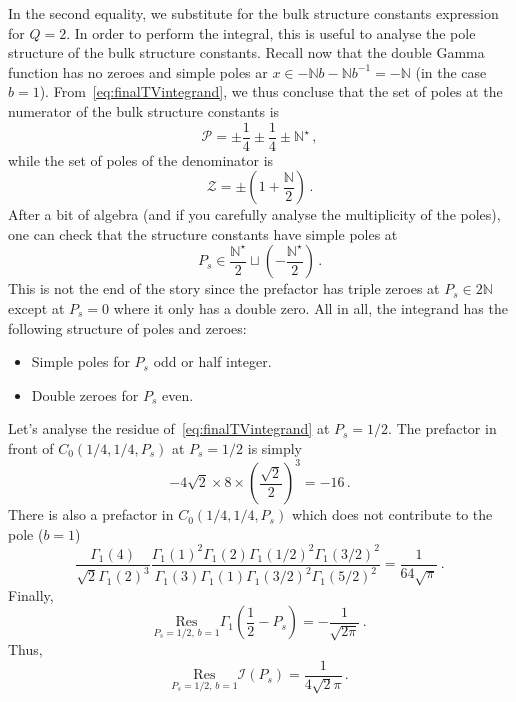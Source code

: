 \documentclass[11pt]{article}
\begin{document}
In the second equality, we substitute for the bulk structure constants expression for $Q=2$. In order to perform the integral, this is useful to analyse the pole structure of the bulk structure constants. Recall now that the double Gamma function has no zeroes and simple poles ar $x\in -\mathbb{N}b-\mathbb{N}b^{-1}=-\mathbb{N}$ (in the case $b=1$). From~\eqref{eq:finalTVintegrand}, we thus concluse that the set of poles at the numerator of the bulk structure constants is
\begin{equation}
    \mathcal{P} = \pm\frac{1}{4}\pm\frac{1}{4}\pm\mathbb{N}^{\star}\,,
\end{equation}
while the set of poles of the denominator is 
\begin{equation}
    \mathcal{Z} = \pm\left(1+\frac{\mathbb{N}}{2}\right)\,.
\end{equation}
After a bit of algebra (and if you carefully analyse the multiplicity of the poles), one can check that the structure constants have simple poles at
\begin{equation}
    P_s \in \frac{\mathbb{N}^\star}{2} \sqcup \left(-\frac{\mathbb{N}^\star}{2}\right)\,.
\end{equation}
This is not the end of the story since the prefactor has triple zeroes at $P_s \in 2\mathbb{N}$ except at $P_s=0$ where it only has a double zero. All in all, the integrand has the following structure of poles and zeroes:
\begin{itemize}
    \item Simple poles for $P_s$ odd or half integer.
    \item Double zeroes for $P_s$ even.
\end{itemize}
Let's analyse the residue of~\eqref{eq:finalTVintegrand} at $P_s=1/2$. The prefactor in front of $C_0(1/4,1/4,P_s)$ at $P_s=1/2$ is simply 
\[
-4\sqrt{2}\times 8 \times \left(\frac{\sqrt{2}}{2}\right)^3 = -16\,.
\]
There is also a prefactor in $C_0(1/4,1/4,P_s)$ which does not contribute to the pole ($b=1$)
\begin{equation}
        \frac{\Gamma_1(4)}{\sqrt{2}\Gamma_1(2)^3}\frac{\Gamma_1(1)^2 \Gamma_1(2)\Gamma_1(1/2)^2 \Gamma_1(3/2)^2}{\Gamma_1(3)\Gamma_1(1)\Gamma_1(3/2)^2 \Gamma_1(5/2)^2}=\frac{1}{64\sqrt{\pi}}\,.
\end{equation}
Finally,
\begin{equation}
    \underset{P_s=1/2,\,b=1}{\mathrm{Res}}\Gamma_1\left(\frac{1}{2}-P_s\right)=-\frac{1}{\sqrt{2\pi}}\,.
\end{equation}
Thus,
\begin{equation}
    \underset{P_s=1/2,\,b=1}{\mathrm{Res}}\mathcal{I}(P_s) = \frac{1}{4\sqrt{2}\pi}\,.
\end{equation}
\end{document}
